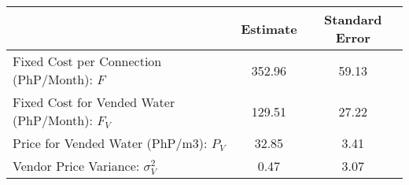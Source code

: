 \begin{tabular}{lcc}
& Estimate & Standard Error \\
\hline
Fixed Cost per Connection (PhP/Month): $F$ &352.96&59.13\\
Fixed Cost for Vended Water (PhP/Month): $F_{V}$ &129.51&27.22\\
Price for Vended Water (PhP/m3): $P_{V}$ &32.85&3.41\\
Vendor Price Variance: $\sigma_{V}^2$  &0.47&3.07\\
\hline
\end{tabular}
